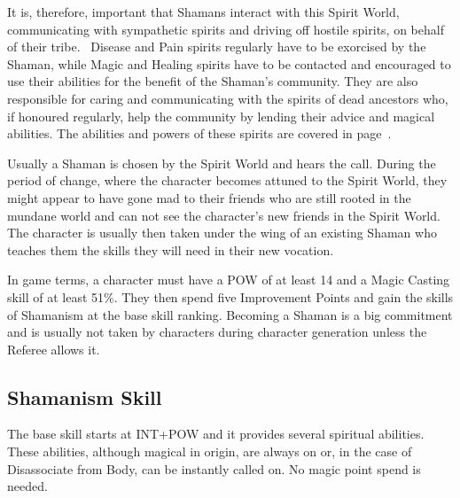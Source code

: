 It is, therefore, important that Shamans interact with this Spirit World, communicating with sympathetic spirits and driving off hostile spirits, on behalf of their tribe.  Disease and Pain spirits regularly have to be exorcised by the Shaman, while Magic and Healing spirits have to be contacted and encouraged to use their abilities for the benefit of the Shaman’s community. They are also responsible for caring and communicating with the spirits of dead ancestors who, if honoured regularly, help the community by lending their advice and magical abilities. The abilities and powers of these spirits are covered in page~\pageref{sec:spirits}.

Usually a Shaman is chosen by the Spirit World and hears the call. During the period of change, where the character becomes attuned to the Spirit World, they might appear to have gone mad to their friends who are still rooted in the mundane world and can not see the character’s new friends in the Spirit World.  The character is usually then taken under the wing of an existing Shaman who teaches them the skills they will need in their new vocation.

In game terms, a character must have a POW of at least 14 and a Magic Casting skill of at least 51\%. They then spend five Improvement Points and gain the skills of Shamanism at the base skill ranking.  Becoming a Shaman is a big commitment and is usually not taken by characters during character generation unless the Referee allows it.

\subsection{Shamanism Skill}
The base skill starts at INT+POW and it provides several spiritual abilities. These abilities, although magical in origin, are always on or, in the case of Disassociate from Body, can be instantly called on. No magic point spend is needed.

